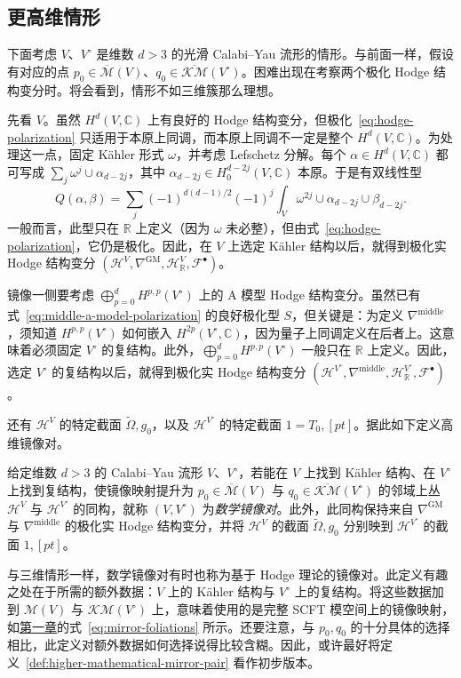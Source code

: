 \subsection{更高维情形}\label{subsec:higher-dimensional-mirror}
下面考虑 $V$、$V^\circ$ 是维数 $d>3$ 的光滑 Calabi--Yau 流形的情形。与前面一样，假设有对应的点 $p_0\in\overline{\mathcal M}(V)$、$q_0\in\overline{\mathcal{KM}}(V^\circ)$。困难出现在考察两个极化 Hodge 结构变分时。将会看到，情形不如三维簇那么理想。

先看 $V$。虽然 $H^d(V,\mathbb C)$ 上有良好的 Hodge 结构变分，但极化~\eqref{eq:hodge-polarization} 只适用于本原上同调，而本原上同调不一定是整个 $H^d(V,\mathbb C)$。为处理这一点，固定 Kähler 形式 $\omega$，并考虑 Lefschetz 分解。每个 $\alpha\in H^d(V,\mathbb C)$ 都可写成 $\sum_j\omega^j\cup\alpha_{d-2j}$，其中 $\alpha_{d-2j}\in H^{d-2j}_0(V,\mathbb C)$ 本原。于是有双线性型
\[
Q(\alpha,\beta)=\sum_j(-1)^{d(d-1)/2}(-1)^j
\int_V\omega^{2j}\cup\alpha_{d-2j}\cup\beta_{d-2j}.
\]
一般而言，此型只在 $\mathbb R$ 上定义（因为 $\omega$ 未必整），但由式~\eqref{eq:hodge-polarization}，它仍是极化。因此，在 $V$ 上选定 Kähler 结构以后，就得到极化实 Hodge 结构变分 $(\mathcal H^V,\nabla^{\mathrm{GM}},\mathcal H^V_{\mathbb R},\mathcal F^\bullet)$。

镜像一侧要考虑 $\bigoplus_{p=0}^dH^{p,p}(V^\circ)$ 上的 A 模型 Hodge 结构变分。虽然已有式~\eqref{eq:middle-a-model-polarization} 的良好极化型 $S$，但关键是：为定义 $\nabla^{\mathrm{middle}}$，须知道 $H^{p,p}(V^\circ)$ 如何嵌入 $H^{2p}(V^\circ,\mathbb C)$，因为量子上同调定义在后者上。这意味着必须固定 $V^\circ$ 的复结构。此外，$\bigoplus_{p=0}^dH^{p,p}(V^\circ)$ 一般只在 $\mathbb R$ 上定义。因此，选定 $V^\circ$ 的复结构以后，就得到极化实 Hodge 结构变分 $(\mathcal H^{V^\circ},\nabla^{\mathrm{middle}},\mathcal H^{V^\circ}_{\mathbb R},\mathcal F^\bullet)$。

还有 $\mathcal H^V$ 的特定截面 $\widetilde\Omega,g_0$，以及 $\mathcal H^{V^\circ}$ 的特定截面 $1=T_0,[pt]$。据此如下定义高维镜像对。
\begin{definition}\label{def:higher-mathematical-mirror-pair}
给定维数 $d>3$ 的 Calabi--Yau 流形 $V$、$V^\circ$，若能在 $V$ 上找到 Kähler 结构、在 $V^\circ$ 上找到复结构，使镜像映射提升为 $p_0\in\overline{\mathcal M}(V)$ 与 $q_0\in\overline{\mathcal{KM}}(V^\circ)$ 的邻域上丛 $\mathcal H^V$ 与 $\mathcal H^{V^\circ}$ 的同构，就称 $(V,V^\circ)$ 为\emph{数学镜像对}。此外，此同构保持来自 $\nabla^{\mathrm{GM}}$ 与 $\nabla^{\mathrm{middle}}$ 的极化实 Hodge 结构变分，并将 $\mathcal H^V$ 的截面 $\widetilde\Omega,g_0$ 分别映到 $\mathcal H^{V^\circ}$ 的截面 $1,[pt]$。
\end{definition}
与三维情形一样，数学镜像对有时也称为基于 Hodge 理论的镜像对。此定义有趣之处在于所需的额外数据：$V$ 上的 Kähler 结构与 $V^\circ$ 上的复结构。将这些数据加到 $\mathcal M(V)$ 与 $\mathcal{KM}(V^\circ)$ 上，意味着使用的是完整 SCFT 模空间上的镜像映射，如\hyperref[chap:introduction]{第一章}的式~\eqref{eq:mirror-foliations} 所示。还要注意，与 $p_0,q_0$ 的十分具体的选择相比，此定义对额外数据如何选择说得比较含糊。因此，或许最好将定义~\ref{def:higher-mathematical-mirror-pair} 看作初步版本。

